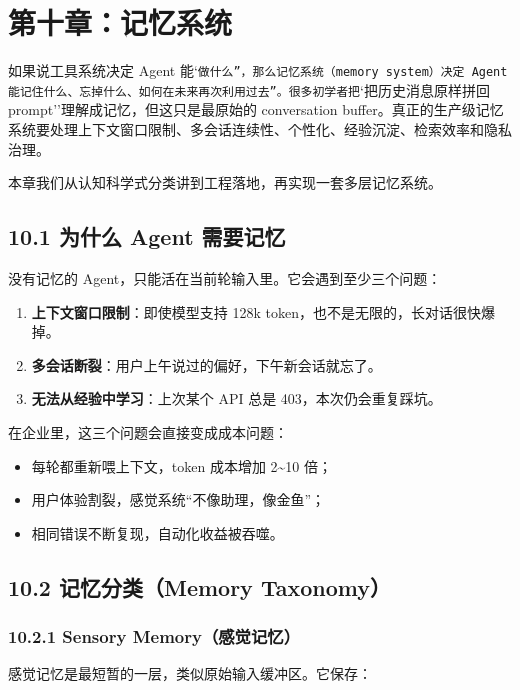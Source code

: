 \chapter{第十章：记忆系统}

如果说工具系统决定 Agent 能`\texttt{做什么''，那么记忆系统（memory system）决定 Agent 能}\texttt{记住什么、忘掉什么、如何在未来再次利用过去''。很多初学者把}`把历史消息原样拼回 prompt''理解成记忆，但这只是最原始的 conversation buffer。真正的生产级记忆系统要处理上下文窗口限制、多会话连续性、个性化、经验沉淀、检索效率和隐私治理。


本章我们从认知科学式分类讲到工程落地，再实现一套多层记忆系统。


\section{10.1 为什么 Agent 需要记忆}

没有记忆的 Agent，只能活在当前轮输入里。它会遇到至少三个问题：


\begin{enumerate}[leftmargin=2em]
\item \textbf{上下文窗口限制}：即使模型支持 128k token，也不是无限的，长对话很快爆掉。
\item \textbf{多会话断裂}：用户上午说过的偏好，下午新会话就忘了。
\item \textbf{无法从经验中学习}：上次某个 API 总是 403，本次仍会重复踩坑。
\end{enumerate}

在企业里，这三个问题会直接变成成本问题：


\begin{itemize}[leftmargin=2em]
\item 每轮都重新喂上下文，token 成本增加 2\textasciitilde{}10 倍；
\item 用户体验割裂，感觉系统``不像助理，像金鱼''；
\item 相同错误不断复现，自动化收益被吞噬。
\end{itemize}

\section{10.2 记忆分类（Memory Taxonomy）}

\subsection{10.2.1 Sensory Memory（感觉记忆）}

感觉记忆是最短暂的一层，类似原始输入缓冲区。它保存：


